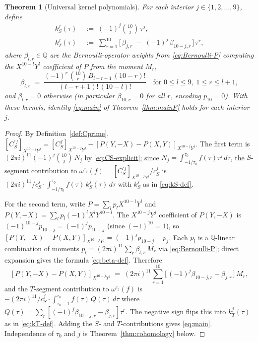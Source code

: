 \documentclass[11pt,letterpaper]{article}
\newtheorem{theorem}{Theorem}[section]
\newcommand{\QQ}{\mathbb{Q}}
\newcommand{\eps}{\varepsilon}
\begin{document}
\begin{theorem}[Universal kernel polynomials]\label{thm:kernels}
For each interior $j \in \{1, 2, \ldots, 9\}$, define
\begin{align}
  k_S^{j}(\tau) &\;:=\; (-1)^j\binom{10}{j}\,\tau^j, \label{eq:kS-def}\\
  k_T^{j}(\tau) &\;:=\; \sum_{r=1}^{10}\bigl[\,\beta_{j,r} \;-\; (-1)^j\,\beta_{10-j,r}\,\bigr]\,\tau^r, \label{eq:kT-def}
\end{align}
where $\beta_{l, r} \in \QQ$ are the Bernoulli-operator weights from
\eqref{eq:Bernoulli-P} computing the $X^{10-l}Y^l$ coefficient of $P$
from the moment $M_r$,
\begin{equation}\label{eq:beta-def}
  \beta_{l, r} \;=\;
    \frac{(-1)^r\,\binom{10}{r}\,B_{l-r+1}\,(10-r)!}{(l-r+1)!\,(10-l)!}
  \quad\text{for } 0 \le l \le 9,\; 1 \le r \le l+1,
\end{equation}
and $\beta_{l, r} = 0$ otherwise (in particular $\beta_{10, r} = 0$ for
all $r$, encoding $p_{10} = 0$).  With these kernels, identity
\eqref{eq:main} of Theorem~\ref{thm:mainP} holds for each interior $j$.
\end{theorem}

\begin{proof}
By Definition~\ref{def:Cprime},
$[C^{\prime f}_S]_{X^{10-j}Y^j} = [C^f_S]_{X^{10-j}Y^j}
 - [P(Y, -X) - P(X, Y)]_{X^{10-j}Y^j}$.
The first term is $(2\pi i)^{11}(-1)^j\binom{10}{j}\,N_j$ by
\eqref{eq:CS-explicit}; since
$N_j = \int_{-1/\tau_0}^{\tau_0}\!f(\tau)\tau^j\,d\tau$, the $S$-segment
contribution to
$\omega^{\eps_j}(f) = [C^{\prime f}_S]_{X^{10-j}Y^j}/c_S^j$ is
$(2\pi i)^{11}/c_S^j \cdot \int_{-1/\tau_0}^{\tau_0}\!f(\tau)\,k_S^j(\tau)\,d\tau$
with $k_S^j$ as in \eqref{eq:kS-def}.

For the second term, write $P = \sum_{l}p_l X^{10-l}Y^l$ and
$P(Y, -X) = \sum_l p_l(-1)^l X^l Y^{10-l}$.  The $X^{10-j}Y^j$
coefficient of $P(Y, -X)$ is $(-1)^{10-j}p_{10-j} = (-1)^j p_{10-j}$
(since $(-1)^{10} = 1$), so $[P(Y, -X) - P(X, Y)]_{X^{10-j}Y^j} =
(-1)^j p_{10-j} - p_j$.  Each $p_l$ is a $\QQ$-linear combination of
moments $p_l = (2\pi i)^{11}\sum_r \beta_{l,r}\,M_r$ via
\eqref{eq:Bernoulli-P}; direct expansion gives the formula
\eqref{eq:beta-def}.  Therefore
\[
  [P(Y, -X) - P(X, Y)]_{X^{10-j}Y^j} \;=\;
    (2\pi i)^{11}\sum_{r=1}^{10}\bigl[\,(-1)^j\beta_{10-j, r} - \beta_{j, r}\,\bigr]\,M_r,
\]
and the $T$-segment contribution to $\omega^{\eps_j}(f)$ is
$-(2\pi i)^{11}/c_S^j\cdot\int_{\tau_0-1}^{\tau_0}\!f(\tau)\,Q(\tau)\,d\tau$
where $Q(\tau) = \sum_r [(-1)^j\beta_{10-j, r} - \beta_{j, r}]\tau^r$.
The negative sign flips this into $k_T^j(\tau)$ as in \eqref{eq:kT-def}.
Adding the $S$- and $T$-contributions gives \eqref{eq:main}.
Independence of $\tau_0$ and $j$ is Theorem~\ref{thm:cohomology} below.
\end{proof}
\end{document}
